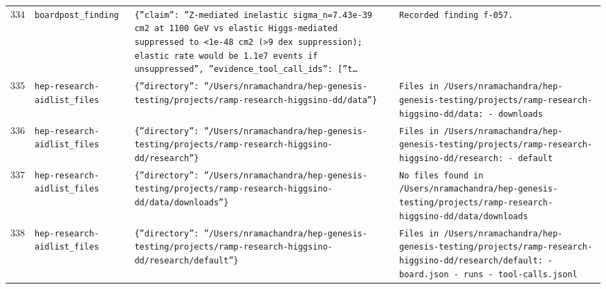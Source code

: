 \documentclass[11pt,a4paper]{article}
\begin{document}
\begin{longtable}{@{}p{}p{}p{}p{}@{}}
334 & \texttt{board}\newline\texttt{post\_\allowbreak{}finding} & \texttt{\{''claim'':\allowbreak{} ''Z-mediated inelastic sigma\_\allowbreak{}n=\allowbreak{}7.43e-39 cm2 at 1100 GeV vs elastic Higgs-mediated suppressed to \textless{}\allowbreak{}1e-48 cm2 (\textgreater{}\allowbreak{}9 dex suppression)\allowbreak{};\allowbreak{} elastic rate would be 1.1e7 events if unsuppressed'',\allowbreak{} ''evidence\_\allowbreak{}tool\_\allowbreak{}call\_\allowbreak{}ids'':\allowbreak{} [''t\ldots{}\allowbreak{}} & \texttt{Recorded finding f-057.} \\
335 & \texttt{hep-research-aid}\newline\texttt{list\_\allowbreak{}files} & \texttt{\{''directory'':\allowbreak{} ''/\allowbreak{}Users/\allowbreak{}nramachandra/\allowbreak{}hep-genesis-testing/\allowbreak{}projects/\allowbreak{}ramp-research-higgsino-dd/\allowbreak{}data''\}\allowbreak{}} & \texttt{Files in /\allowbreak{}Users/\allowbreak{}nramachandra/\allowbreak{}hep-genesis-testing/\allowbreak{}projects/\allowbreak{}ramp-research-higgsino-dd/\allowbreak{}data:\allowbreak{}   - downloads} \\
336 & \texttt{hep-research-aid}\newline\texttt{list\_\allowbreak{}files} & \texttt{\{''directory'':\allowbreak{} ''/\allowbreak{}Users/\allowbreak{}nramachandra/\allowbreak{}hep-genesis-testing/\allowbreak{}projects/\allowbreak{}ramp-research-higgsino-dd/\allowbreak{}research''\}\allowbreak{}} & \texttt{Files in /\allowbreak{}Users/\allowbreak{}nramachandra/\allowbreak{}hep-genesis-testing/\allowbreak{}projects/\allowbreak{}ramp-research-higgsino-dd/\allowbreak{}research:\allowbreak{}   - default} \\
337 & \texttt{hep-research-aid}\newline\texttt{list\_\allowbreak{}files} & \texttt{\{''directory'':\allowbreak{} ''/\allowbreak{}Users/\allowbreak{}nramachandra/\allowbreak{}hep-genesis-testing/\allowbreak{}projects/\allowbreak{}ramp-research-higgsino-dd/\allowbreak{}data/\allowbreak{}downloads''\}\allowbreak{}} & \texttt{No files found in /\allowbreak{}Users/\allowbreak{}nramachandra/\allowbreak{}hep-genesis-testing/\allowbreak{}projects/\allowbreak{}ramp-research-higgsino-dd/\allowbreak{}data/\allowbreak{}downloads} \\
338 & \texttt{hep-research-aid}\newline\texttt{list\_\allowbreak{}files} & \texttt{\{''directory'':\allowbreak{} ''/\allowbreak{}Users/\allowbreak{}nramachandra/\allowbreak{}hep-genesis-testing/\allowbreak{}projects/\allowbreak{}ramp-research-higgsino-dd/\allowbreak{}research/\allowbreak{}default''\}\allowbreak{}} & \texttt{Files in /\allowbreak{}Users/\allowbreak{}nramachandra/\allowbreak{}hep-genesis-testing/\allowbreak{}projects/\allowbreak{}ramp-research-higgsino-dd/\allowbreak{}research/\allowbreak{}default:\allowbreak{}   - board.json   - runs   - tool-calls.jsonl} \\

\end{longtable}
\end{document}
